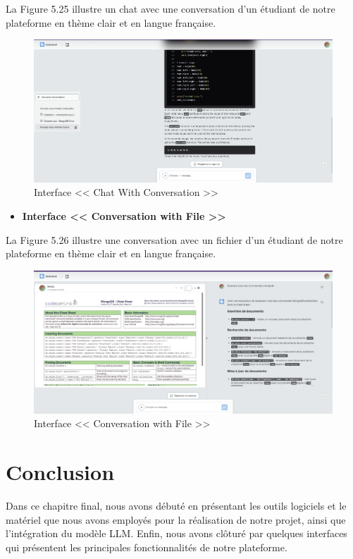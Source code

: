 La Figure 5.25 illustre un chat avec une conversation d'un étudiant de notre plateforme en thème clair et en langue française.
\begin{figure}[H]
    \centering
    \includegraphics[width=1.1\textwidth,height=0.5\textwidth]{images/chp5/fig25.png}
    \caption{Interface << Chat With Conversation >>}
    \label{Interface << Chat With Conversation >>}    
\end{figure}
\begin{itemize}
    \item \textbf{Interface << Conversation with File >>}
\end{itemize}
La Figure 5.26 illustre une conversation avec un fichier d'un étudiant de notre plateforme en thème clair et en langue française.
\begin{figure}[H]
    \centering
    \includegraphics[width=1.1\textwidth,height=0.5\textwidth]{images/chp5/fig26.png}
    \caption{Interface << Conversation with File >>}
    \label{Interface << Conversation with File >>}    
\end{figure}
\section*{Conclusion}
Dans ce chapitre final, nous avons débuté en présentant les outils logiciels et le matériel que nous avons employés pour la réalisation de notre projet, ainsi que l'intégration du modèle LLM. Enfin, nous avons clôturé par quelques interfaces qui présentent les principales fonctionnalités de notre plateforme.

